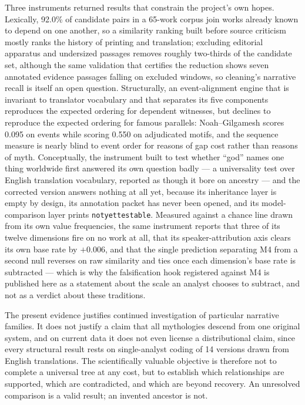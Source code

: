 \documentclass[11pt]{article}
\DeclareRobustCommand{\_}{\textunderscore\allowbreak}
\begin{document}
Three instruments returned results that constrain the project's own hopes.
Lexically, 92.0\% of candidate pairs in a 65-work corpus join works already known
to depend on one another, so a similarity ranking built before source criticism
mostly ranks the history of printing and translation; excluding editorial
apparatus and undersized passages removes roughly two-thirds of the candidate set,
although the same validation that certifies the reduction shows seven annotated
evidence passages falling on excluded windows, so cleaning's narrative recall is
itself an open question. Structurally, an event-alignment engine that is invariant
to translator vocabulary and that separates its five components reproduces the
expected ordering for dependent witnesses, but declines to reproduce the expected
ordering for famous parallels: Noah--Gilgamesh scores 0.095 on events while
scoring 0.550 on adjudicated motifs, and the sequence measure is nearly blind to
event order for reasons of gap cost rather than reasons of myth. Conceptually, the
instrument built to test whether ``god'' names one thing worldwide first answered
its own question badly --- a universality test over English translation vocabulary,
reported as though it bore on ancestry --- and the corrected version answers
nothing at all yet, because its inheritance layer is empty by design, its
annotation packet has never been opened, and its model-comparison layer prints
\texttt{not\_yet\_testable}. Measured against a chance line drawn from its own
value frequencies, the same instrument reports that three of its twelve
dimensions fire on no work at all, that its speaker-attribution axis clears its
own base rate by \(+0.006\), and that the single prediction separating M4 from a
second null reverses on raw similarity and ties once each dimension's base rate
is subtracted --- which is why the falsification hook registered against M4 is
published here as a statement about the scale an analyst chooses to subtract, and
not as a verdict about these traditions.

The present evidence justifies continued investigation of particular narrative
families. It does not justify a claim that all mythologies descend from one
original system, and on current data it does not even license a distributional
claim, since every structural result rests on single-analyst coding of 14 versions
drawn from English translations. The scientifically valuable objective is
therefore not to complete a universal tree at any cost, but to establish which
relationships are supported, which are contradicted, and which are beyond
recovery. An unresolved comparison is a valid result; an invented ancestor is not.
\end{document}
